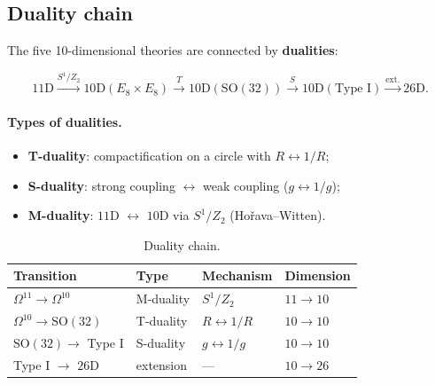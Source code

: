 \documentclass[11pt,a4paper]{article}
\newcommand{\SO}{\mathrm{SO}}
\newcommand{\Omt}{\Omega^{10}}
\newcommand{\Ome}{\Omega^{11}}
\theoremstyle{definition}
\begin{document}
\subsection{Duality chain}
\label{subsec:duality-chain}

The five 10-dimensional theories are connected by \textbf{dualities}:

\begin{equation}
    \boxed{
    11\text{D} \xrightarrow{S^1/Z_2} 
    10\text{D}(E_8 \times E_8) \xrightarrow{T} 
    10\text{D}(\SO(32)) \xrightarrow{S} 
    10\text{D}(\text{Type I}) \xrightarrow{\text{ext.}} 
    26\text{D}.
    }
    \label{eq:duality-chain}
\end{equation}

\paragraph{Types of dualities.}
\begin{itemize}
    \item \textbf{T-duality}: compactification on a circle 
          with $R \leftrightarrow 1/R$;
    \item \textbf{S-duality}: strong coupling $\leftrightarrow$ 
          weak coupling ($g \leftrightarrow 1/g$);
    \item \textbf{M-duality}: $11$D $\leftrightarrow$ $10$D 
          via $S^1/Z_2$ (Hořava--Witten).
\end{itemize}

\begin{table}[htbp]
\centering
\caption{Duality chain.}
\label{tab:dualities}
\begin{tabular}{llll}
\toprule
Transition & Type & Mechanism & Dimension \\
\midrule
$\Ome \to \Omt$ & M-duality & $S^1/Z_2$ & $11 \to 10$ \\
$\Omt \to \SO(32)$ & T-duality & $R \leftrightarrow 1/R$ & $10 \to 10$ \\
$\SO(32) \to$ Type I & S-duality & $g \leftrightarrow 1/g$ & $10 \to 10$ \\
Type I $\to$ $26$D & extension & --- & $10 \to 26$ \\
\bottomrule
\end{tabular}
\end{table}
\end{document}
